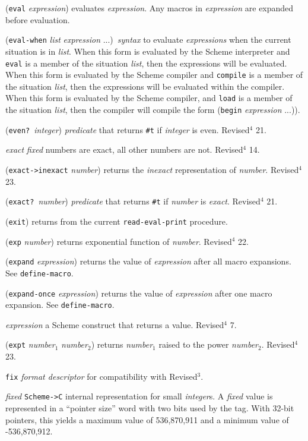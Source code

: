 \documentclass[10pt,twocolumn]{article}
\begin{document}
(\texttt{eval} \emph{expression}) evaluates \emph{expression}.  Any macros in
\emph{expression} are expanded before evaluation.

(\texttt{eval-when} \emph{list} \emph{expression} ...)\ \emph{syntax} to evaluate
\emph{expressions} when the current situation is in \emph{list}.  When this
form is evaluated by the Scheme interpreter and \texttt{eval} is a member
of the situation \emph{list}, then the expressions will be evaluated.
When this form is evaluated by the Scheme compiler and \texttt{compile} is
a member of the situation \emph{list}, then the expressions will be
evaluated within the compiler.  When this form is evaluated by the
Scheme compiler, and \texttt{load} is a member of the situation \emph{list},
then the compiler will compile the form (\texttt{begin} \emph{expression} ...)).

(\texttt{even?}\ \emph{integer}) \emph{predicate} that returns \texttt{\#t} if
\emph{integer} is even.  Revised$^4$ 21.

\emph{exact} \qquad \emph{fixed} numbers are exact, all other numbers are not.
Revised$^4$ 14.

(\texttt{exact->inexact} \emph{number}) returns the \emph{inexact} representation
of \emph{number}. Revised$^4$ 23.

(\texttt{exact?}\ \emph{number}) \emph{predicate} that returns \texttt{\#t} if
\emph{number} is \emph{exact}.  Revised$^4$ 21.

(\texttt{exit}) returns from the current \texttt{read-eval-print} procedure.

(\texttt{exp} \emph{number}) returns exponential function of \emph{number}.
Revised$^4$ 22.

(\texttt{expand} \emph{expression}) returns the value of \emph{expression} after
all macro expansions.  See \texttt{define-macro}.

(\texttt{expand-once} \emph{expression}) returns the value of \emph{expression}
after one macro expansion.  See \texttt{define-macro}.

\emph{expression} a Scheme construct that returns a value.  Revised$^4$ 7.

(\texttt{expt} \emph{number}$_1$ \emph{number}$_2$) returns  \emph{number}$_1$
raised to the power \emph{number}$_2$.  Revised$^4$ 23.

\texttt{fix} \emph{format descriptor} for compatibility with Revised$^3$.

\emph{fixed} \texttt{Scheme->C} internal representation for small \emph{integer}s.  A
\emph{fixed} value is represented in a ``pointer size'' word with two bits
used by the tag.  With 32-bit pointers, this yields a maximum value
of 536,870,911 and a minimum value of -536,870,912. 
\end{document}
